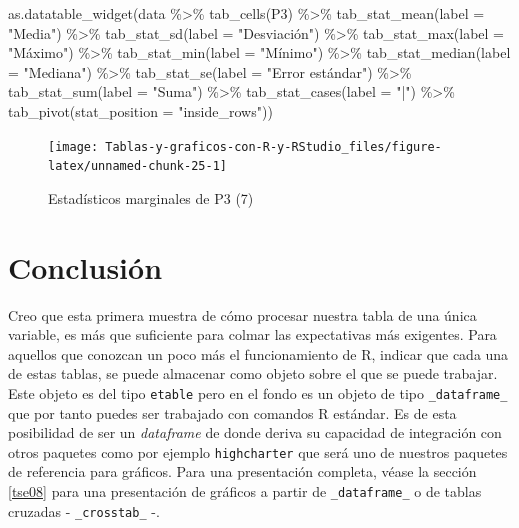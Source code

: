 \documentclass[
]{book}
\newenvironment{Shaded}{\begin{snugshade}}{\end{snugshade}}
\newcommand{\AttributeTok}[1]{\textcolor[rgb]{0.77,0.63,0.00}{#1}}
\newcommand{\FunctionTok}[1]{\textcolor[rgb]{0.00,0.00,0.00}{#1}}
\newcommand{\NormalTok}[1]{#1}
\newcommand{\SpecialCharTok}[1]{\textcolor[rgb]{0.00,0.00,0.00}{#1}}
\newcommand{\StringTok}[1]{\textcolor[rgb]{0.31,0.60,0.02}{#1}}
\begin{document}
\begin{Shaded}
\begin{Highlighting}[]
\FunctionTok{as.datatable\_widget}\NormalTok{(data }\SpecialCharTok{\%\textgreater{}\%}
  \FunctionTok{tab\_cells}\NormalTok{(P3) }\SpecialCharTok{\%\textgreater{}\%}
  \FunctionTok{tab\_stat\_mean}\NormalTok{(}\AttributeTok{label =} \StringTok{"Media"}\NormalTok{) }\SpecialCharTok{\%\textgreater{}\%}
  \FunctionTok{tab\_stat\_sd}\NormalTok{(}\AttributeTok{label =} \StringTok{"Desviación"}\NormalTok{) }\SpecialCharTok{\%\textgreater{}\%}
  \FunctionTok{tab\_stat\_max}\NormalTok{(}\AttributeTok{label =} \StringTok{"Máximo"}\NormalTok{) }\SpecialCharTok{\%\textgreater{}\%}
  \FunctionTok{tab\_stat\_min}\NormalTok{(}\AttributeTok{label =} \StringTok{"Mínimo"}\NormalTok{) }\SpecialCharTok{\%\textgreater{}\%}
  \FunctionTok{tab\_stat\_median}\NormalTok{(}\AttributeTok{label =} \StringTok{"Mediana"}\NormalTok{) }\SpecialCharTok{\%\textgreater{}\%}
  \FunctionTok{tab\_stat\_se}\NormalTok{(}\AttributeTok{label =} \StringTok{"Error estándar"}\NormalTok{) }\SpecialCharTok{\%\textgreater{}\%}
  \FunctionTok{tab\_stat\_sum}\NormalTok{(}\AttributeTok{label =} \StringTok{"Suma"}\NormalTok{) }\SpecialCharTok{\%\textgreater{}\%}
  \FunctionTok{tab\_stat\_cases}\NormalTok{(}\AttributeTok{label =} \StringTok{"|"}\NormalTok{) }\SpecialCharTok{\%\textgreater{}\%}
  \FunctionTok{tab\_pivot}\NormalTok{(}\AttributeTok{stat\_position =} \StringTok{"inside\_rows"}\NormalTok{))}
\end{Highlighting}
\end{Shaded}

\begin{figure}[H]

{\centering \texttt{[image: Tablas-y-graficos-con-R-y-RStudio\_files/figure-latex/unnamed-chunk-25-1]} 

}

\caption{Estadísticos marginales de P3 (7)}\label{fig:unnamed-chunk-25}
\end{figure}

\hypertarget{conclusiuxf3n-1}{%
\section{Conclusión}\label{conclusiuxf3n-1}}

Creo que esta primera muestra de cómo procesar nuestra tabla de una única variable, es más que suficiente para colmar las expectativas más exigentes. Para aquellos que conozcan un poco más el funcionamiento de R, indicar que cada una de estas tablas, se puede almacenar como objeto sobre el que se puede trabajar. Este objeto es del tipo \texttt{etable} pero en el fondo es un objeto de tipo \texttt{\_dataframe\_} que por tanto puedes ser trabajado con comandos R estándar. Es de esta posibilidad de ser un \emph{dataframe} de donde deriva su capacidad de integración con otros paquetes como por ejemplo \texttt{highcharter} \citet{highcharter} que será uno de nuestros paquetes de referencia para gráficos. Para una presentación completa, véase la sección \ref{tse08} para una presentación de gráficos a partir de \texttt{\_dataframe\_} o de tablas cruzadas - \texttt{\_crosstab\_} -.
\end{document}

